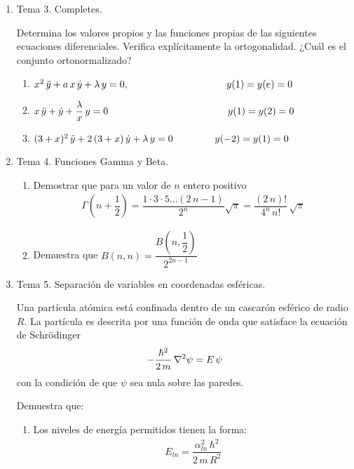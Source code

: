 \begin{enumerate}
\item Tema 3. Completes.
\par
Determina los valores propios y las funciones propias de las siguientes ecuaciones diferenciales. Verifica explícitamente la ortogonalidad. ¿Cuál es el conjunto ortonormalizado?
\begin{enumerate}[label=\roman*.]
\item $x^{2} \, \ddot{y} + a \, x \, \dot{y} + \lambda \, y = 0, \hspace{3.5cm} y(1) = y(e) = 0$
\item $x \, \ddot{y} + \dot{y} + \dfrac{\lambda}{x} \, y = 0 \hspace{4.3cm} y(1) = y(2) = 0$
\item $(3 + x)^{2} \, \ddot{y} + 2 \, (3 + x) \, \dot{y} + \lambda \, y = 0 \hspace{1.5cm} y(-2) = y(1) = 0$
\end{enumerate}
\item Tema 4. Funciones Gamma y Beta.
\par
\begin{enumerate}
\item Demostrar que para un valor de $n$ entero positivo
\begin{align*}
\Gamma(n + \dfrac{1}{2}) = \dfrac{1 \cdot 3 \cdot 5 \ldots (2 \, n - 1)}{2^{n}} \sqrt{\pi} = \dfrac{(2 \, n)!}{4^{n} \, n!} \, \sqrt{\pi}
\end{align*}
\item Demuestra que $B(n, n) = \dfrac{B \left( n, \dfrac{1}{2}\right)}{2^{2n -1}}$
\end{enumerate}
\item Tema 5. Separación de variables en coordenadas esféricas.
\par
Una partícula atómica está confinada dentro de un cascarón esférico de radio $R$. La partícula es descrita por una función de onda que satisface la ecuación de Schrödinger
\begin{align*}
- \dfrac{\hbar^{2}}{2 \, m} \, \laplacian{\psi} =  E \, \psi
\end{align*}
con la condición de que $\psi$ sea nula sobre las paredes.
\par
Demuestra que:
\begin{enumerate}[label=\roman*.]
\item Los niveles de energía permitidos tienen la forma:
\begin{align*}
E_{l n} = \dfrac{\alpha_{l n}^{2} \, \hbar^{2}}{2 \, m \, R^{2}}
\end{align*}

\end{enumerate}
\end{enumerate}
